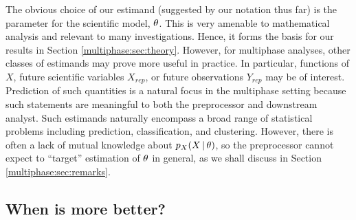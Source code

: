 The obvious choice of our estimand (suggested by our notation thus far) is the parameter for the scientific model, $\theta$.
This is very amenable to mathematical analysis and relevant to many investigations.
Hence, it forms the basis for our results in Section \ref{multiphase:sec:theory}.
However, for multiphase analyses, other classes of estimands may prove more useful in practice.
In particular, functions of $X$, future scientific variables $X_{rep}$, or future observations $Y_{rep}$ may be of interest.
Prediction of such quantities is a natural focus in the multiphase setting because such statements are meaningful to both the preprocessor and downstream analyst.
Such estimands naturally encompass a broad range of statistical problems including prediction, classification, and clustering.
However, there is often a lack of mutual knowledge about $p_X(X \, | \, \theta)$, so the preprocessor cannot expect to ``target'' estimation of $\theta$ in general, as we shall discuss in Section \ref{multiphase:sec:remarks}.


\subsection{When is more better?}
\label{multiphase:sec:riskmonotone}

